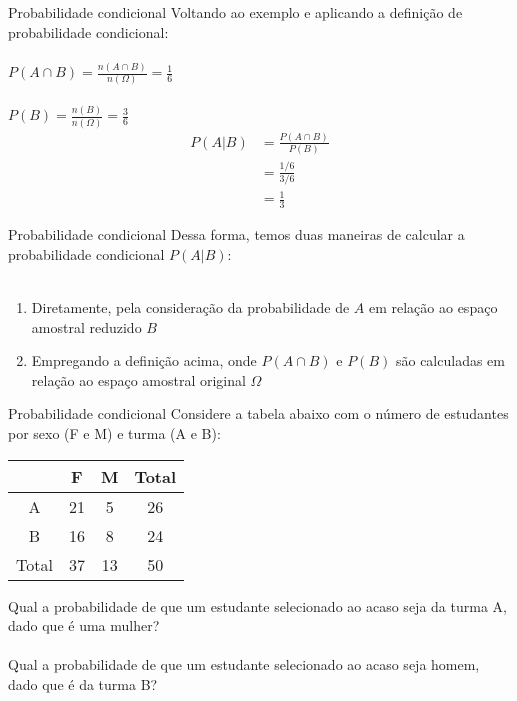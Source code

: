 \documentclass[10pt]{beamer}\usepackage[]{graphicx}\usepackage[]{color}
\theoremstyle{definition}
\begin{document}
\begin{frame}{Probabilidade condicional}
  Voltando ao exemplo e aplicando a definição de probabilidade
  condicional: \\~\\
  $P(A \cap B) = \frac{n(A \cap B)}{n(\Omega)} = \frac{1}{6}$ \\~\\
  $P(B) = \frac{n(B)}{n(\Omega)} = \frac{3}{6}$
  \vspace{1em}
  \begin{align*}
    P(A|B) &= \frac{P(A \cap B)}{P(B)} \\
     &= \frac{1/6}{3/6} \\
     &= \frac{1}{3}
  \end{align*}
\end{frame}

\begin{frame}{Probabilidade condicional}
  Dessa forma, temos duas maneiras de calcular a probabilidade
  condicional $P(A|B)$: \\~\\
  \begin{enumerate}
  \item Diretamente, pela consideração da probabilidade de $A$ em
    relação ao espaço amostral reduzido $B$
  \item Empregando a definição acima, onde $P(A \cap B)$ e $P(B)$ são
    calculadas em relação ao espaço amostral original $\Omega$
  \end{enumerate}
\end{frame}

\begin{frame}{Probabilidade condicional}
  Considere a tabela abaixo com o número de estudantes por sexo (F e M)
  e turma (A e B):
  \begin{table}
    \centering
    \begin{tabular}{c|cc|c}
      \hline
      & F & M & Total \\
      \hline
      A & 21 & 5 & 26 \\
      B & 16 & 8 & 24 \\
      \hline
      Total & 37 & 13 & 50 \\
      \hline
    \end{tabular}
  \end{table}
  Qual a probabilidade de que um estudante selecionado ao acaso seja da
  turma A, dado que é uma mulher? \\~\\
  Qual a probabilidade de que um estudante selecionado ao acaso seja
  homem, dado que é da turma B?
\end{frame}
\end{document}
